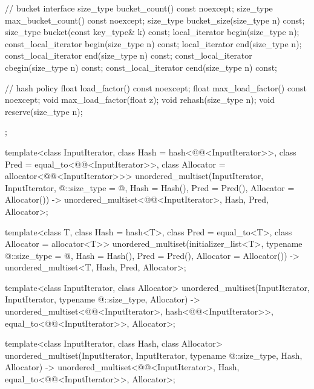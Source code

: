 \begin{codeblock}
{{    // bucket interface
    size_type bucket_count() const noexcept;
    size_type max_bucket_count() const noexcept;
    size_type bucket_size(size_type n) const;
    size_type bucket(const key_type& k) const;
    local_iterator begin(size_type n);
    const_local_iterator begin(size_type n) const;
    local_iterator end(size_type n);
    const_local_iterator end(size_type n) const;
    const_local_iterator cbegin(size_type n) const;
    const_local_iterator cend(size_type n) const;

    // hash policy
    float load_factor() const noexcept;
    float max_load_factor() const noexcept;
    void max_load_factor(float z);
    void rehash(size_type n);
    void reserve(size_type n);
  };

  template<class InputIterator,
           class Hash = hash<@@<InputIterator>>,
           class Pred = equal_to<@@<InputIterator>>,
           class Allocator = allocator<@@<InputIterator>>>
    unordered_multiset(InputIterator, InputIterator, @\seebelow@::size_type = @\seebelow@,
                       Hash = Hash(), Pred = Pred(), Allocator = Allocator())
      -> unordered_multiset<@@<InputIterator>,
                            Hash, Pred, Allocator>;

  template<class T, class Hash = hash<T>,
           class Pred = equal_to<T>, class Allocator = allocator<T>>
    unordered_multiset(initializer_list<T>, typename @\seebelow@::size_type = @\seebelow@,
                       Hash = Hash(), Pred = Pred(), Allocator = Allocator())
      -> unordered_multiset<T, Hash, Pred, Allocator>;

  template<class InputIterator, class Allocator>
    unordered_multiset(InputIterator, InputIterator, typename @\seebelow@::size_type, Allocator)
      -> unordered_multiset<@@<InputIterator>,
                            hash<@@<InputIterator>>,
                            equal_to<@@<InputIterator>>,
                            Allocator>;

  template<class InputIterator, class Hash, class Allocator>
    unordered_multiset(InputIterator, InputIterator, typename @\seebelow@::size_type,
                       Hash, Allocator)
      -> unordered_multiset<@@<InputIterator>, Hash,
                            equal_to<@@<InputIterator>>,
                            Allocator>;

}
\end{codeblock}
